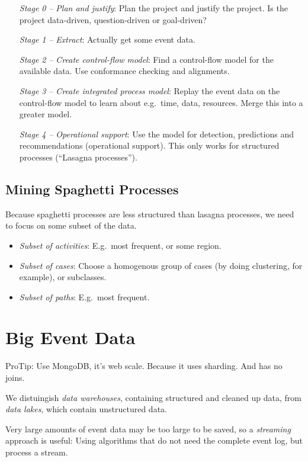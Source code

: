 \documentclass[english]{panikzettel}
\begin{document}
\begin{enumerate}[leftmargin=60pt]
    \item[\emph{Stage 0 --}] \emph{Plan and justify}: Plan the project and justify the project. Is the project data-driven, question-driven or goal-driven?
    \item[\emph{Stage 1 --}] \emph{Extract}: Actually get some event data.
    \item[\emph{Stage 2 --}] \emph{Create control-flow model}: Find a control-flow model for the available data. Use conformance checking and alignments.
    \item[\emph{Stage 3 --}] \emph{Create integrated process model}: Replay the event data on the control-flow model to learn about e.g.\ time, data, resources. Merge this into a greater model.
    \item[\emph{Stage 4 --}] \emph{Operational support}: Use the model for detection, predictions and recommendations (operational support). This only works for structured processes (``Lasagna processes'').
\end{enumerate}

\subsection{Mining Spaghetti Processes}

Because spaghetti processes are less structured than lasagna processes, we need to focus on some subset of the data.
\begin{itemize}
    \item \emph{Subset of activities}: E.g.\ most frequent, or some region.
    \item \emph{Subset of cases}: Choose a homogenous group of cases (by doing clustering, for example), or subclasses.
    \item \emph{Subset of paths}: E.g.\ most frequent.
\end{itemize}

\section{Big Event Data}

{\tiny ProTip: Use MongoDB, it's web scale. Because it uses sharding. And has no joins.}

We distuingish \emph{data warehouses}, containing structured and cleaned up data, from \emph{data lakes}, which contain unstructured data.

Very large amounts of event data may be too large to be saved, so a \emph{streaming} approach is useful: Using algorithms that do not need the complete event log, but process a stream.
\end{document}
